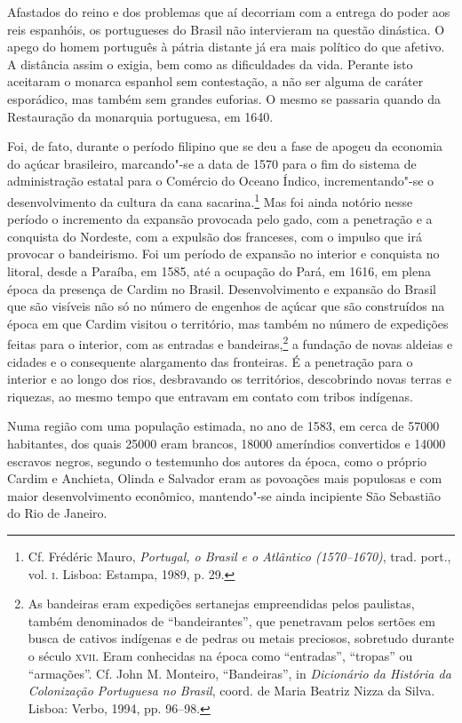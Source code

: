Afastados do reino e dos problemas que aí decorriam com a entrega do
poder aos reis espanhóis, os portugueses do Brasil não intervieram na
questão dinástica. O apego do homem português à pátria distante já era
mais político do que afetivo. A distância assim o exigia, bem como as
dificuldades da vida. Perante isto aceitaram o monarca espanhol sem
contestação, a não ser alguma de caráter esporádico, mas também sem
grandes euforias. O mesmo se passaria quando da Restauração da
monarquia portuguesa, em 1640. 

Foi, de fato, durante o período filipino que se deu a fase de
apogeu da economia do açúcar brasileiro, marcando"-se a data de 1570
para o fim do sistema de administração estatal para o Comércio do
Oceano Índico, incrementando"-se o desenvolvimento da cultura da cana
sacarina.\footnote{ Cf. Frédéric Mauro, \textit{Portugal, o
Brasil e o Atlântico (1570--1670)}, trad. port., vol. \textsc{i}. Lisboa:
Estampa, 1989, p. 29.} Mas foi ainda notório nesse período o
incremento da expansão provocada pelo gado, com a penetração e a
conquista do Nordeste, com a expulsão dos franceses, com o impulso que
irá provocar o bandeirismo. Foi um período de expansão no interior e
conquista no litoral, desde a Paraíba, em 1585, até a ocupação do Pará,
em 1616, em plena época da presença de Cardim no Brasil. 
Desenvolvimento e expansão do Brasil que são visíveis não só no número
de engenhos de açúcar que são construídos na época em que Cardim
visitou o território, mas também no número de expedições feitas para o
interior, com as entradas e bandeiras,\footnote{ As bandeiras eram
expedições sertanejas empreendidas pelos paulistas, também denominados
de ``bandeirantes'', que penetravam pelos sertões em busca de cativos
indígenas e de pedras ou metais preciosos, sobretudo durante o século
\textsc{xvii}. Eram conhecidas na época como ``entradas'', ``tropas'' ou ``armações''.
Cf. John M. Monteiro, ``Bandeiras'', in \textit{Dicionário da História
da Colonização Portuguesa no Brasil}, coord. de Maria Beatriz Nizza da
Silva. Lisboa: Verbo, 1994, pp. 96--98.} a fundação de novas aldeias e
cidades e o consequente alargamento das fronteiras. É a penetração para
o interior e ao longo dos rios, desbravando os territórios, descobrindo
novas terras e riquezas, ao mesmo tempo que entravam em contato com tribos indígenas. 

Numa região com uma população estimada, no ano de 1583, em cerca de
57000 habitantes, dos quais 25000 eram brancos, 18000 ameríndios
convertidos e 14000 escravos negros, segundo o testemunho dos autores
da época, como o próprio Cardim e Anchieta, Olinda e Salvador eram as
povoações mais populosas e com maior desenvolvimento econômico,
mantendo"-se ainda incipiente São Sebastião do Rio de Janeiro.


